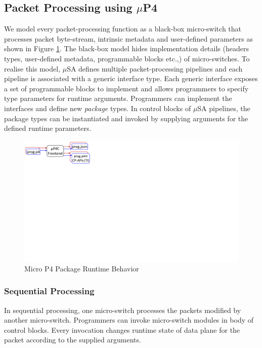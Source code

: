 \subsection{Packet Processing using $\mu$P4}
\label{subsection:packet-processing-using-mp4}
We model every packet-processing function as a black-box micro-switch that processes packet byte-stream, intrinsic metadata and user-defined parameters as shown in Figure \ref{fig:package-runtime-behavior}.
The black-box model hides implementation details (headers types, user-defined metadata, programmable blocks etc.,) of micro-switches.
To realise this model, $\mu$SA defines multiple packet-processing pipelines and each pipeline is associated with a generic interface type.
Each generic interface exposes a set of programmable blocks to implement and allows programmers to specify type parameters for runtime arguments.
Programmers can implement the interfaces and define new \emph{package} types.
In control blocks of $\mu$SA pipelines, the package types can be instantiated and invoked by supplying arguments for the defined runtime parameters. 
\begin{figure}[!h]
    \centering
    \includegraphics[trim=300 300 0 0, clip,scale=0.2]{mp4c-frontend}
    \caption{Micro P4 Package Runtime Behavior}
    \label{fig:package-runtime-behavior}
\end{figure}

\subsubsection{Sequential Processing}
In sequential processing, one micro-switch processes the packets modified by another micro-switch.
Programmers can invoke micro-switch modules in body of control blocks.
Every invocation changes runtime state of data plane for the packet according to the supplied arguments.






